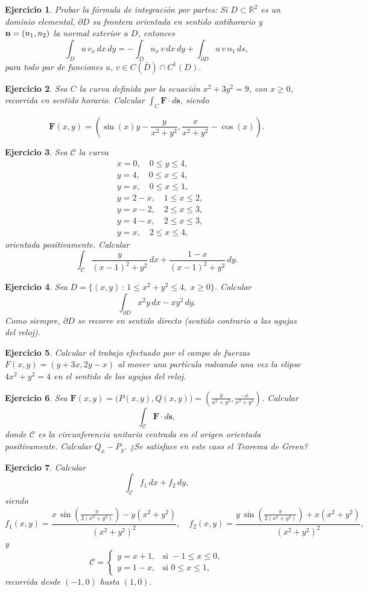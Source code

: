 \documentclass[11pt,a4paper,pdftex]{amsart}
\newtheorem{ej}{Ejercicio}%
\numberwithin{equation}{section}%
\newcommand{\bej}[1]{\begin{ej}\rm{#1}}
\newcommand{\eej}{\end{ej}\vspace{-0.2cm}}
\renewcommand{\bf}{\textbf}
\newcommand{\C}{\mathcal C}
\newcommand{\R}{\mathbb R}
\newcommand{\0}{\mathbb O}
\newcommand{\8}{\infty}
\begin{document}
\bej
Probar la fórmula de integración por partes: Si \(D\subset \R^2\) es un dominio elemental, \(\partial D\) su frontera orientada en sentido antihorario y \({\bf n}=(n_1,n_2)\) la normal exterior a \(D\), entonces
\[
\int_D u\,v_x\,dx\,dy = -\int_D u_x\,v\,dx\,dy + \int_{\partial D} u\,v\,n_1\,ds,
\]
para todo par de funciones \(u,\,v\in C(\bar{D})\cap C^1(D)\).
\eej

\bej
Sea \( C \) la curva definida por la ecuación \( x^2 + 3y^2 = 9 \), con \( x \geq 0 \), recorrida en sentido horario.  
Calcular \( \int_C \mathbf{F} \cdot d\mathbf{s} \), siendo  

\[
\mathbf{F}(x,y) =
\left (
\sin(x)y - \frac{y}{x^2 + y^2},
\frac{x}{x^2 + y^2} - \cos(x)
\right ).
\]
\eej

\bej
Sea \(\C\) la curva
\[
\begin{aligned}
&x=0,\quad 0\le y\le4,\\[1ex]
&y=4,\quad 0\le x\le 4,\\[1ex]
&y=x,\quad 0\le x\le 1,\\[1ex]
&y=2-x,\quad 1\le x\le 2,\\[1ex]
&y=x-2,\quad 2\le x\le 3,\\[1ex]
&y=4-x,\quad 2\le x\le 3,\\[1ex]
&y=x,\quad 2\le x\le 4,
\end{aligned}
\]
orientada positivamente. Calcular
\[
\int_\C \frac{y}{(x-1)^2+y^2}\,dx+\frac{1-x}{(x-1)^2+y^2}\,dy.
\]
\eej

\bej
Sea \(D=\{(x,y)\,:\,1\le x^2+y^2\le4,\;x\ge0\}\). Calcular
\[
\int_{\partial D} x^2y\,dx-xy^2\,dy.
\]
Como siempre, \(\partial D\) se recorre en sentido directo (sentido contrario a las agujas del reloj).
\eej

\bej
Calcular el trabajo efectuado por el campo de fuerzas \(F(x,y)=(y+3x,2y-x)\) al mover una partícula rodeando una vez la elipse \(4x^2+y^2=4\) en el sentido de las agujas del reloj.
\eej

\bej
Sea \(\textbf{F}(x,y)=\big(P(x,y),Q(x,y)\big)=\left(\frac{y}{x^2+y^2},\frac{-x}{x^2+y^2}\right)\). Calcular
\[
\int_\C \textbf{F}\cdot d\textbf{s},
\]
donde \(\C\) es la circunferencia unitaria centrada en el origen orientada positivamente.
Calcular \(Q_x-P_y\). ¿Se satisface en este caso el Teorema de Green?
\eej

\bej
Calcular
\[
\int_{\mathcal{C}} f_1\,dx + f_2\,dy,
\]
siendo
\[
f_1(x,y)=\frac{ x\,\sin\left(\frac{\pi}{2(x^2+y^2)}\right)-y(x^2+y^2)}{(x^2+y^2)^2},\quad
f_2(x,y)=\frac{ y\,\sin\left(\frac{\pi}{2(x^2+y^2)}\right)+x(x^2+y^2)}{(x^2+y^2)^2},
\]
y
\[
\mathcal{C}=\begin{cases}
y=x+1, & \textrm{si } -1\le x \le 0,\\[1ex]
y=1-x, & \textrm{si } 0\le x \le 1,
\end{cases}
\]
recorrida desde \((-1,0)\) hasta \((1,0)\).
\eej
\end{document}
